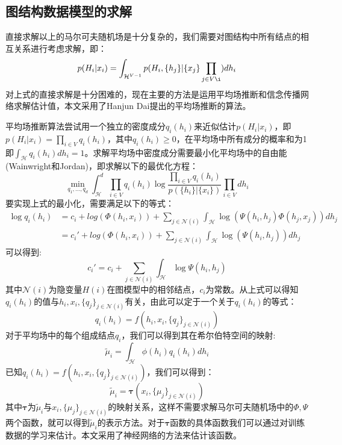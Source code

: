 \subsection{图结构数据模型的求解}
直接求解以上的马尔可夫随机场是十分复杂的，我们需要对图结构中所有结点的相互关系进行考虑求解，即：
\begin{equation}
p(H_i|{x_i}) = \int_{\mathcal{H}^{V-1}} p(H_i, \{h_j\}| \{x_j\}\prod_{j\in V\i})dh_i
\end{equation}
对上式的直接求解是十分困难的，现在主要的方法是运用平均场推断和信念传播网络求解估计值，本文采用了Hanjun Dai\cite{dai2016discriminative}提出的平均场推断的算法。
\par 平均场推断算法尝试用一个独立的密度成分$q_i(h_i)$来近似估计$p(H_i|{x_i})$，即$p(H_i|{x_i})=\prod_{i\in V} q_i(h_i)$，其中$q_i(h_i)\ge 0$，在平均场中所有成分的概率和为1即$\int_\mathcal{H} q_i(h_i)dh_i=1$。求解平均场中密度成分需要最小化平均场中的自由能(Wainwright和Jordan\cite{wainwright2008graphical})，即求解以下的最优化方程：
\begin{equation}
\min_{q_1, ..., q_d} \int_\mathcal{H}^d \prod_{i\in V}q_i(h_i)\log \frac{\prod_{i\in V}q_i(h_i)}{p(\{h_i\}|\{x_i\})}\prod_{i\in V}dh_i
\end{equation}
要实现上式的最小化，需要满足以下的等式：
\begin{align}
\log q_i(h_i) &= c_i + log( \Phi(h_i, x_i)) + \sum_{j\in \mathcal{N}(i)} \int_\mathcal{H}\log (\Psi(h_i, h_j) \Phi(h_j, x_j))dh_j\\
&={c_i}'+ log( \Phi(h_i, x_i)) + \sum_{j\in \mathcal{N}(i)} \int_\mathcal{H}\log (\Psi(h_i, h_j))dh_j
\end{align}
可以得到:
$$c_i' = c_i + \sum_{j\in \mathcal{N}(i)} \int_\mathcal{H}\log \Psi(h_i, h_j)  $$
其中$\mathcal{N}(i)$为隐变量$H(i)$在图模型中的相邻结点，$c_i$为常数。从上式可以得知$q_i(h_i)$的值与$h_i, x_i, \{q_j\}_{j\in \mathcal{N}(i)}$有关，由此可以定于一个关于$q_i(h_i)$的等式：
\begin{equation}
q_i(h_i) =  f(h_i, x_i,  \{q_j\}_{j\in \mathcal{N}(i)})
\end{equation}
对于平均场中的每个组成结点$q_i$，我们可以得到其在希尔伯特空间的映射:
\begin{equation}
\tilde{\mu}_i = \int_{\mathcal{H}} \phi(h_i)q_i(h_i)dh_i
\end{equation}
已知$q_i(h_i) =  f(h_i, x_i,  \{q_j\}_{j\in \mathcal{N}(i)})$，我们可以得到：
\begin{equation}
\tilde{\mu}_i = \boldsymbol{\tau} (x_i, \{\mu_j\}_{j\in \mathcal{N}(i)})
\end{equation}
其中$\boldsymbol{\tau}$为$\tilde{\mu}_i$与$x_i, \{\mu_j\}_{j\in \mathcal{N}(i)}$的映射关系，这样不需要求解马尔可夫随机场中的$\Phi, \Psi$两个函数，就可以得到$\tilde{\mu}_i$的表示方法。对于$\boldsymbol{\tau}$函数的具体函数我们可以通过对训练数据的学习来估计。本文采用了神经网络的方法来估计该函数。
